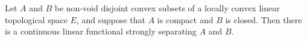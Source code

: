 Let $A$ and $B$ be non-void disjoint convex subsets of a locally convex linear topological space $E$, and suppose that $A$ is compact and $B$ is closed. Then there is a continuous linear functional strongly separating $A$ and $B$.

